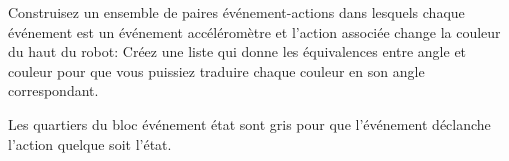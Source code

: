 Construisez un ensemble de paires événement-actions
dans lesquels chaque événement est un événement accéléromètre
et l'action associée change la couleur du haut du robot:
Créez une liste qui donne les équivalences entre angle
et couleur pour que vous puissiez traduire chaque couleur
en son angle correspondant.

Les quartiers du bloc événement état sont gris pour que 
l'événement déclanche l'action quelque soit l'état.

\bigskip

